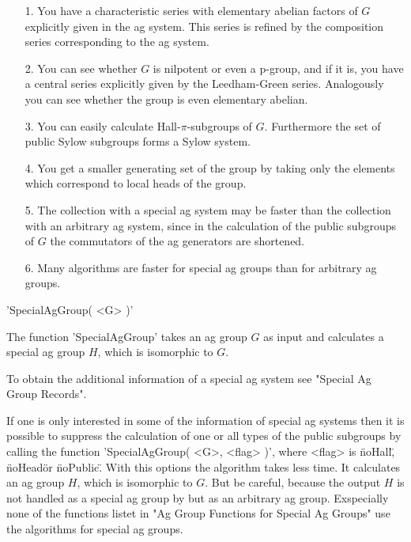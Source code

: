 \begin{itemize}
\item[1.]
You have a characteristic series with elementary abelian factors of $G$
explicitly given in the ag system. This series is refined by the
composition series corresponding to the ag system.

\item[2.]
You can see whether $G$ is nilpotent or even a p-group, and if it is, you
have a central series explicitly given by the Leedham-Green
series. Analogously you can see whether the group is even elementary
abelian.

\item[3.]
You can easily calculate Hall-$\pi$-subgroups of $G$. Furthermore the set
of public Sylow subgroups forms a Sylow system.

\item[4.]
You get a smaller generating set of the group by taking only the elements
which correspond to local heads of the group.

\item[5.]
The collection with a special ag system may be faster than the collection
with an arbitrary ag system, since in the calculation of the public
subgroups of $G$ the commutators of the ag generators are shortened.

\item[6.]
Many algorithms are faster for special ag groups than for arbitrary ag
groups.

\end{itemize}


'SpecialAgGroup( <G> )' 

The function 'SpecialAgGroup' takes an ag group $G$ as input and
calculates a special ag group $H$, which is isomorphic to $G$.

To obtain the additional information of a special ag system see "Special
Ag Group Records".


If one is only interested in some of the information of special ag
systems then it is possible to suppress the calculation of one or all
types of the public subgroups by calling the function
'SpecialAgGroup( <G>, <flag> )', where <flag> is \"noHall\", \"noHead\" or 
\"noPublic\". 
With this options the algorithm takes less time. It calculates an ag
group $H$, which is isomorphic to $G$. But be careful, because the output
$H$ is not handled as a special ag group by {\GAP} but as an arbitrary ag
group.  Exspecially none of the functions listet in "Ag Group Functions
for Special Ag Groups" use the algorithms for special ag groups.

